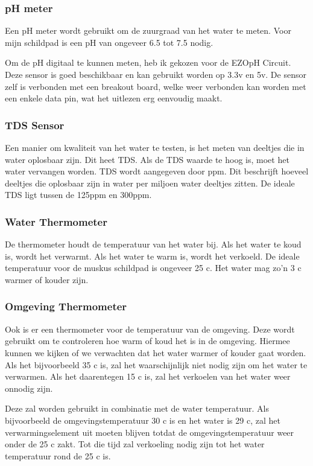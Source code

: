 \documentclass[a4paper]{report}
\begin{document}
\subsubsection{pH meter}
Een pH meter wordt gebruikt om de zuurgraad van het water te meten. 
Voor mijn schildpad is een pH van ongeveer 6.5 tot 7.5 nodig. 

Om de pH digitaal te kunnen meten, heb ik gekozen voor de  EZO\texttrademark \space pH Circuit. 
Deze sensor is goed beschikbaar en kan gebruikt worden op 3.3v en 5v. De sensor zelf is verbonden met een breakout board, welke weer verbonden kan worden met een enkele data pin, wat het uitlezen erg eenvoudig maakt.

\subsubsection{TDS Sensor}
Een manier om kwaliteit van het water te testen, is het meten van deeltjes die in water oplosbaar zijn.
Dit heet \ac{TDS}. Als de TDS waarde te hoog is, moet het water vervangen worden. 
TDS wordt aangegeven door \ac{ppm}. Dit beschrijft hoeveel deeltjes die oplosbaar zijn in water per miljoen water deeltjes zitten. De ideale TDS ligt tussen de 125ppm en 300ppm. 

\subsubsection{Water Thermometer}
De thermometer houdt de temperatuur van het water bij. Als het water te koud is, wordt het verwarmt. Als het water te warm is, wordt het verkoeld.
De ideale temperatuur voor de muskus schildpad is ongeveer 25 \textdegree c. Het water mag zo'n 3 \textdegree c warmer of kouder zijn.

\subsubsection{Omgeving Thermometer}
Ook is er een thermometer voor de temperatuur van de omgeving. Deze wordt gebruikt om te controleren hoe warm of koud het is in de omgeving. Hiermee kunnen we kijken of we verwachten dat het water warmer of kouder gaat worden.
Als het bijvoorbeeld 35 \textdegree c is, zal het waarschijnlijk niet nodig zijn om het water te verwarmen. Als het daarentegen 15 \textdegree c is, zal het verkoelen van het water weer onnodig zijn.

Deze zal worden gebruikt in combinatie met de water temperatuur. Als bijvoorbeeld de omgevingstemperatuur 30 \textdegree c is en het water is 29 \textdegree c, zal het verwarmingselement uit moeten blijven totdat de omgevingstemperatuur weer onder de 25 \textdegree c zakt. Tot die tijd zal verkoeling nodig zijn tot het water temperatuur rond de 25 \textdegree c is.
\end{document}
